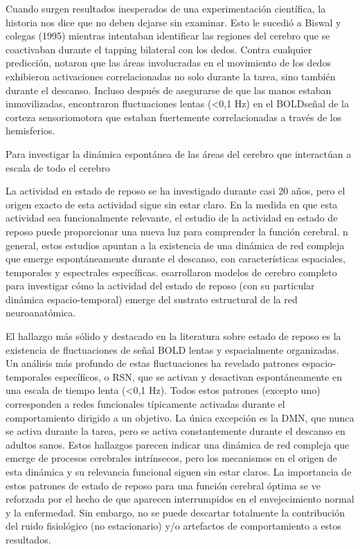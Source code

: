 Cuando surgen resultados inesperados de una experimentación científica, la historia nos dice que no deben dejarse sin examinar. Esto le sucedió a Biswal y colegas (1995) mientras intentaban identificar las regiones del cerebro que se coactivaban durante el tapping bilateral con los dedos. Contra cualquier predicción, notaron que las áreas involucradas en el movimiento de los dedos exhibieron activaciones correlacionadas no solo durante la tarea, sino también durante el descanso.  Incluso después de asegurarse de que las manos estaban inmovilizadas, encontraron  fluctuaciones lentas (<0,1 Hz) en el BOLDseñal de la corteza sensoriomotora que estaban fuertemente correlacionadas a través de los hemisferios. 

Para investigar la dinámica espontánea de las áreas del cerebro que interactúan a escala de todo el cerebro

La actividad en estado de reposo se ha investigado durante casi 20 años, pero el origen exacto de esta actividad sigue sin estar claro. En la medida en que esta actividad sea funcionalmente relevante, el estudio de la actividad en estado de reposo puede proporcionar una nueva luz para comprender la función cerebral. n general, estos estudios apuntan a la existencia de una dinámica de red compleja que emerge espontáneamente durante el descanso, con características espaciales, temporales y espectrales específicas.  esarrollaron modelos de cerebro completo para investigar cómo la actividad del estado de reposo (con su particular dinámica espacio-temporal) emerge del sustrato estructural de la red neuroanatómica.

El hallazgo más sólido y destacado en la literatura sobre estado de reposo es la existencia de fluctuaciones de señal BOLD lentas y espacialmente organizadas. Un análisis más profundo de estas fluctuaciones ha revelado patrones espacio-temporales específicos, o RSN, que se activan y desactivan espontáneamente en una escala de tiempo lenta (<0,1 Hz). Todos estos patrones (excepto uno) corresponden a redes funcionales típicamente activadas durante el comportamiento dirigido a un objetivo. La única excepción es la DMN, que nunca se activa durante la tarea, pero se activa constantemente durante el descanso en adultos sanos. Estos hallazgos parecen indicar una dinámica de red compleja que emerge de procesos cerebrales intrínsecos, pero los mecanismos en el origen de esta dinámica y su relevancia funcional siguen sin estar claros. La importancia de estos patrones de estado de reposo para una función cerebral óptima se ve reforzada por el hecho de que aparecen interrumpidos en el envejecimiento normal y la enfermedad. Sin embargo, no se puede descartar totalmente la contribución del ruido fisiológico (no estacionario) y/o artefactos de comportamiento a estos resultados.





